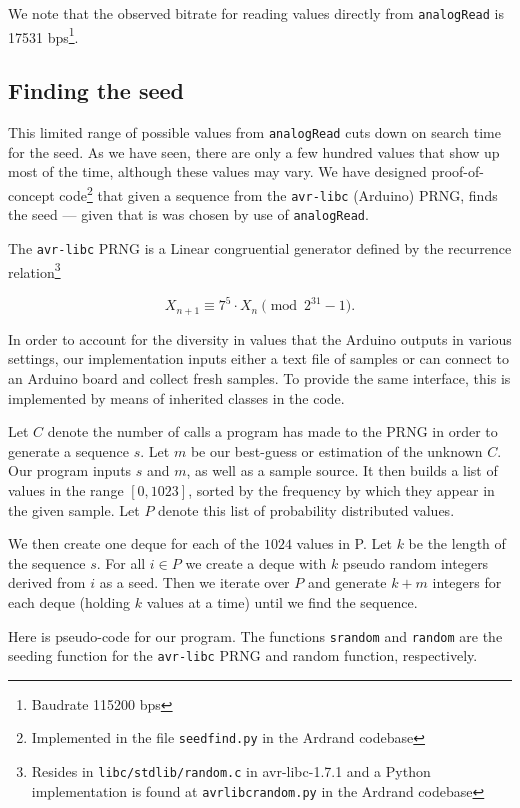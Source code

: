 \documentclass[a4paper]{article}           %
\begin{document}
We note that the observed bitrate for reading values directly from \texttt{analogRead} is 17531 bps\footnote{Baudrate 115200 bps}. 

\subsection{Finding the seed}
\label{sec:seedfind}

This limited range of possible values from \texttt{analogRead} cuts down on search time for the seed. As we have seen, there are only a few hundred values that show up most of the time, although these values may vary. We have designed proof-of-concept code\footnote{Implemented in the file \texttt{seedfind.py} in the Ardrand codebase} that given a sequence from the \texttt{avr-libc} (Arduino) PRNG, finds the seed --- given that is was chosen by use of \texttt{analogRead}. 

The \texttt{avr-libc} PRNG is a Linear congruential generator defined by the recurrence relation\footnote{Resides in \texttt{libc/stdlib/random.c} in avr-libc-1.7.1 and a Python implementation is found at \texttt{avrlibcrandom.py} in the Ardrand codebase}

\[
X_{n+1} \equiv 7^5 \cdot X_n \pmod{2^{31} -1}.
\]

In order to account for the diversity in values that the Arduino outputs in various settings, our implementation inputs either a text file of samples or can connect to an Arduino board and collect fresh samples. To provide the same interface, this is implemented by means of inherited classes in the code. 

Let $C$ denote the number of calls a program has made to the PRNG in order to generate a sequence $s$. Let $m$ be our best-guess or estimation of the unknown $C$. Our program inputs $s$ and $m$, as well as a sample source. It then builds a list of values in the range $[0, 1023]$, sorted by the frequency by which they appear in the given sample. Let $P$ denote this list of probability distributed values.

We then create one deque for each of the $1024$ values in P. Let $k$ be the length of the sequence $s$. For all $i \in P$ we create a deque with $k$ pseudo random integers derived from $i$ as a seed. Then we iterate over $P$ and generate $k+m$ integers for each deque (holding $k$ values at a time) until we find the sequence. 

Here is pseudo-code for our program. The functions \texttt{srandom} and \texttt{random} are the seeding function for the \texttt{avr-libc} PRNG and random function, respectively. 
\end{document}
